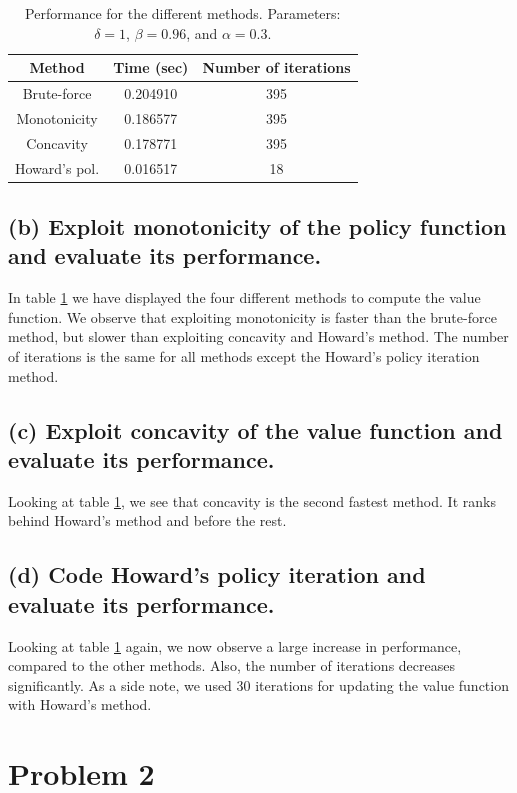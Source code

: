 \documentclass[12pt]{article}
\newcommand{\?}{\stackrel{?}{=}}
\begin{document}
\begin{table}[htbp!]
    \centering
    \begin{tabular}{c|c|c}
         Method & Time (sec) & Number of iterations \\
         \hline
         Brute-force & 0.204910 & 395 \\
         Monotonicity & 0.186577 & 395 \\
         Concavity & 0.178771 & 395 \\
         Howard's pol. & 0.016517 & 18
    \end{tabular}
    \caption{Performance for the different methods. Parameters: $\delta=1$, $\beta=0.96$, and $\alpha=0.3$.}
    \label{tab:res}
\end{table}

\subsection*{(b) Exploit monotonicity of the policy function and evaluate its performance.}
In table \ref{tab:res} we have displayed the four different methods to compute the value function. We observe that exploiting monotonicity is faster than the brute-force method, but slower than exploiting concavity and Howard's method. The number of iterations is the same for all methods except the Howard's policy iteration method.

\subsection*{(c) Exploit concavity of the value function and evaluate its performance.}
Looking at table \ref{tab:res}, we see that concavity is the second fastest method. It ranks behind Howard's method and before the rest.

\subsection*{(d) Code Howard's policy iteration and evaluate its performance.}
Looking at table \ref{tab:res} again, we now observe a large increase in performance, compared to the other methods. Also, the number of iterations decreases significantly. As a side note, we used 30 iterations for updating the value function with Howard's method.




\section*{Problem 2}
\end{document}
